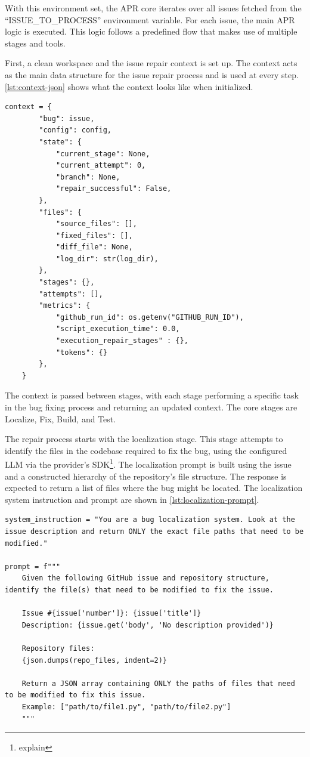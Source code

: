 With this environment set, the APR core iterates over all issues fetched from the ``ISSUE\_TO\_PROCESS'' environment variable. For each issue, the main APR logic is executed. This logic follows a predefined flow that makes use of multiple stages and tools.

First, a clean workspace and the issue repair context is set up. The context acts as the main data structure for the issue repair process and is used at every step. \ref{lst:context-json} shows what the context looks like when initialized.

\begin{lstlisting}[caption={Context JSON}, label={lst:context-json}]  
    context = {
        "bug": issue,
        "config": config,
        "state": {
            "current_stage": None,
            "current_attempt": 0,
            "branch": None,
            "repair_successful": False,
        },
        "files": {
            "source_files": [],
            "fixed_files": [],
            "diff_file": None,
            "log_dir": str(log_dir),
        },
        "stages": {},
        "attempts": [],
        "metrics": {
            "github_run_id": os.getenv("GITHUB_RUN_ID"),
            "script_execution_time": 0.0,
            "execution_repair_stages" : {},
            "tokens": {}
        },
    }
\end{lstlisting}

The context is passed between stages, with each stage performing a specific task in the bug fixing process and returning an updated context. The core stages are Localize, Fix, Build, and Test.

The repair process starts with the localization stage. This stage attempts to identify the files in the codebase required to fix the bug, using the configured \ac{LLM} via the provider's SDK\footnote{explain}. The localization prompt is built using the issue and a constructed hierarchy of the repository's file structure. The response is expected to return a list of files where the bug might be located. The localization system instruction and prompt are shown in \ref{lst:localization-prompt}.

\begin{lstlisting}[caption={Localization Prompt}, label={lst:localization-prompt}]
system_instruction = "You are a bug localization system. Look at the issue description and return ONLY the exact file paths that need to be modified."

prompt = f"""
    Given the following GitHub issue and repository structure, identify the file(s) that need to be modified to fix the issue.

    Issue #{issue['number']}: {issue['title']}
    Description: {issue.get('body', 'No description provided')}

    Repository files:
    {json.dumps(repo_files, indent=2)}

    Return a JSON array containing ONLY the paths of files that need to be modified to fix this issue.
    Example: ["path/to/file1.py", "path/to/file2.py"]
    """
\end{lstlisting}

